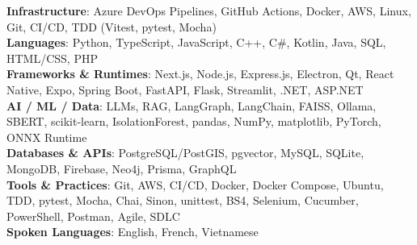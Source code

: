\documentclass[letterpaper,10pt]{article}
\begin{document}
\begin{itemize}[leftmargin=0.15in, label={}]
{{      \textbf{Infrastructure}{: Azure DevOps Pipelines, GitHub Actions, Docker, AWS, Linux, Git, CI/CD, TDD (Vitest, pytest, Mocha)} \\
    \else
      \textbf{Languages}{: Python, TypeScript, JavaScript, C++, C\#, Kotlin, Java, SQL, HTML/CSS, PHP} \\
      \textbf{Frameworks \& Runtimes}{: Next.js, Node.js, Express.js, Electron, Qt, React Native, Expo, Spring Boot, FastAPI, Flask, Streamlit, .NET, ASP.NET} \\
      \textbf{AI / ML / Data}{: LLMs, RAG, LangGraph, LangChain, FAISS, Ollama, SBERT, scikit-learn, IsolationForest, pandas, NumPy, matplotlib, PyTorch, ONNX Runtime} \\
      \textbf{Databases \& APIs}{: PostgreSQL/PostGIS, pgvector, MySQL, SQLite, MongoDB, Firebase, Neo4j, Prisma, GraphQL} \\
      \textbf{Tools \& Practices}{: Git, AWS, CI/CD, Docker, Docker Compose, Ubuntu, TDD, pytest, Mocha, Chai, Sinon, unittest, BS4, Selenium, Cucumber, PowerShell, Postman, Agile, SDLC} \\
    \fi\fi\fi
    \textbf{Spoken Languages}{: English, French, Vietnamese} \\
    }}
  \end{itemize}
\end{document}

